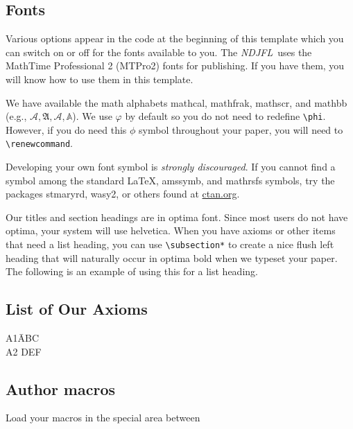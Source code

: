 \documentclass{ndjflart}
\theoremstyle{definition}
\theoremstyle{remark}
\newcommand{\NDJFL}{\emph{NDJFL}}
\newcommand{\origphi}{\phi}
\begin{document}
\subsection{Fonts}\label{fonts} 
Various options appear in the code at the beginning of this template
which you can switch on or off for the fonts available to you.  The
\NDJFL\ uses the MathTime{\tiny\texttrademark} Professional 2
(MTPro2)%
%
%
fonts for publishing.  If you have them, you will know how to use them
in this template.

We have available the math alphabets mathcal, mathfrak, mathscr, and
mathbb (e.g., $\mathcal{A}, \mathfrak{A}, \mathscr{A}, \mathbb{A}$).
We use $\varphi$ by default so you do not need to redefine
\verb=\phi=.  However, if you do need this $\origphi$ symbol
throughout your paper, you will need to \verb=\renewcommand=.

Developing your own font symbol is \emph{strongly discouraged}.  If
you cannot find a symbol among the standard \LaTeX, amssymb, and
mathrsfs symbols, try the packages stmaryrd, wasy2, or others found at
\href{http://www.ctan.org}{ctan.org}.

Our titles and section headings are in optima font.  Since most users
do not have optima, your system will use helvetica.  When you have
axioms or other items that need a list heading, you can use
\verb=\subsection*= to create a nice flush left heading that will
naturally occur in optima bold when we typeset your paper.  The
following is an example of using this for a list heading.

\subsection*{List of Our Axioms}

\begin{tabbing}
  A1\quad \= ABC\\
  A2\> DEF
\end{tabbing} 

\subsection{Author macros}\label{macros} Load your macros in the
special area between
\end{document}
